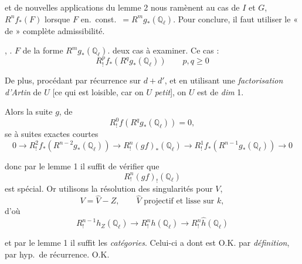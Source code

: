 \documentclass[11pt,a4paper]{article}
\begin{document}
et de nouvelles applications du lemme 2 nous ramènent au cas de $I$ et $G$, $R^{n}f_{*}(F)$ lorsque  $F$ en.\ const.\ $= R^{m}g_{*}(\mathbb{Q}_{\ell})$. Pour conclure, il faut utiliser le «  de \ill{} » \ill{} complète admissibilité.

 \ill{},  \ill{} \ill{} \ill{} \ill{}. $F$  de la forme $R^{m}g_{*}(\mathbb{Q}_{\ell})$.  deux cas à examiner. Ce cas :
\[
R^{p}_{!}f_{*}(R^{q}g_{*}(\mathbb{Q}_{\ell})) \qquad p, q \geq 0
\]


De plus, procédant par récurrence sur $d+d'$, et en utilisant une \emph{factorisation d'Artin} de $U$ [ce qui est loisible, car on   $U$ \emph{petit}], on    $U$ est de \emph{dim} 1.

Alors la suite  \ill{} \ill{} $g$,   de
\[
R^{0}_{!}f(R^{q}g_{*}(\mathbb{Q}_{\ell})) = 0,
\]
se  à \struck{\ill{}}  suites exactes courtes
\[
0 \to R^{2}_{!}f_{*}(R^{n-2}g_{*}(\mathbb{Q}_{\ell})) \to R^{n}_{!}(gf)_{*}(\mathbb{Q}_{\ell}) \to R^{1}_{!}f_{*}(R^{n-1}g_{*}(\mathbb{Q}_{\ell})) \to 0
\]

donc par le lemme 1 il suffit de vérifier que
\[
R^{n}_{!}(gf)_{!}(\mathbb{Q}_{\ell})
\]
est spécial. 
Or utilisons la résolution des singularités pour $V$,
\[
V = \hat{V} - Z, \qquad \hat{V} \text{ projectif et lisse sur } k,
\]
d'où   \ill{}
\[
R^{n-1}_{!}h_{Z}(\mathbb{Q}_{\ell}) \to R^{n}_{!}h(\mathbb{Q}_{\ell}) \to R^{n}_{!}\hat{h}(\mathbb{Q}_{\ell})
\]

et \struck{\ill{}} par le lemme 1 il suffit \ill{} \ill{} \ill{} les \ill{} \emph{catégories}. Celui-ci a \ill{} \ill{} dont \ill{} est O.K. \struck{\ill{}} par \emph{définition}, \ill{} \ill{} par hyp.\ de récurrence. O.K.
\end{document}
